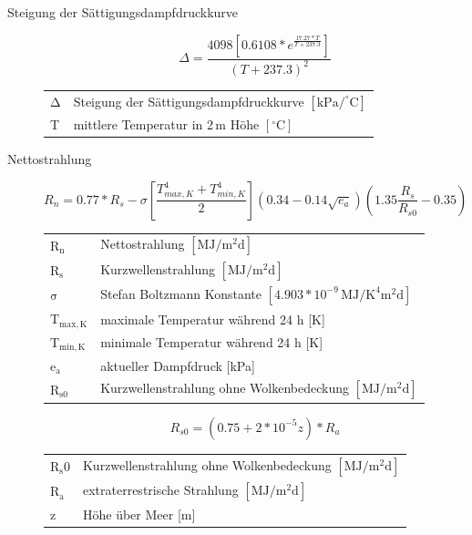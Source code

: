 \begin{description}
\item[Steigung der Sättigungsdampfdruckkurve]
\begin{equation}
\label{eq:delta}
\Delta=\frac{4098\left[0.6108*e^{\frac{17.27*T}{T+237.3}}\right]}{\left(T+237.3\right)^2}
\end{equation}
\begin{table}[H]
\centering
\begin{tabular}{ll}
$\mathrm{\Delta}$ & Steigung der Sättigungsdampfdruckkurve $\mathrm{[kPa/^{\circ}C]}$\\
T & mittlere Temperatur in 2\,m Höhe $\mathrm{[^{\circ}C]}$\\
\end{tabular}
\end{table}

\item[Nettostrahlung]
\begin{equation}
\label{eq:rn}
R_n=0.77*R_s-\sigma\left[\frac{T_{max,K}^4+T_{min,K}^4}{2}\right]\left(0.34-0.14\sqrt{e_a}\right)\left(1.35\frac{R_s}{R_{s0}}-0.35\right)
\end{equation}
\begin{table}[H]
\centering
\begin{tabular}{ll}
$\mathrm{R_n}$ & Nettostrahlung $\mathrm{[MJ/m^2d]}$ \\
$\mathrm{R_s}$ & Kurzwellenstrahlung $\mathrm{[MJ/m^2d]}$ \\
$\mathrm{\sigma}$ & Stefan Boltzmann Konstante $\mathrm{[4.903*10^{-9}\,MJ/K^4m^2d]}$\\
$\mathrm{T_{max,K}}$ & maximale Temperatur während 24 h [K]\\
$\mathrm{T_{min,K}}$ & minimale Temperatur während 24 h [K]\\
$\mathrm{e_a}$ & aktueller Dampfdruck [kPa]\\
$\mathrm{R_{s0}}$ & Kurzwellenstrahlung ohne Wolkenbedeckung $\mathrm{[MJ/m^2d]}$\\
\end{tabular}
\end{table}

\begin{equation}
\label{eq:rs0}
R_{s0}=\left(0.75+2*10^{-5}z\right)*R_a
\end{equation}
\begin{table}[H]
\centering
\begin{tabular}{ll}
$\mathrm{R_s0}$ & Kurzwellenstrahlung ohne Wolkenbedeckung $\mathrm{[MJ/m^2d]}$\\
$\mathrm{R_a}$ & extraterrestrische Strahlung $\mathrm{[MJ/m^2d]}$ \\
z & Höhe über Meer [m]\\
\end{tabular}
\end{table}


\end{description}
